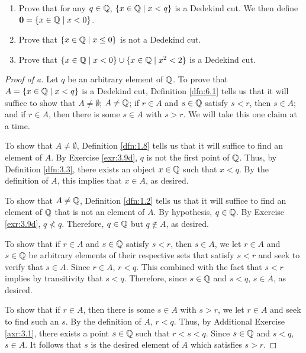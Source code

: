 \documentclass[../main.tex]{subfiles}
\begin{document}
\begin{exercise}\label{exr:6.3}\leavevmode
    \begin{enumerate}[label={(\alph*)},ref={\thetheorem\alph*}]
        \item \label{exr:6.3a}Prove that for any $q\in\mathbb{Q}$, $\{x\in\mathbb{Q}\mid x<q\}$ is a Dedekind cut. We then define $\bm{0}=\{x\in\mathbb{Q}\mid x<0\}$.
        \item \label{exr:6.3b}Prove that $\{x\in\mathbb{Q}\mid x\leq 0\}$ is not a Dedekind cut.
        \item \label{exr:6.3c}Prove that $\{x\in\mathbb{Q}\mid x<0\}\cup\{x\in\mathbb{Q}\mid x^2<2\}$ is a Dedekind cut.
    \end{enumerate}
    \begin{proof}[Proof of a]
        Let $q$ be an arbitrary element of $\mathbb{Q}$. To prove that $A=\{x\in\mathbb{Q}\mid x<q\}$ is a Dedekind cut, Definition \ref{dfn:6.1} tells us that it will suffice to show that $A\neq\emptyset$; $A\neq\mathbb{Q}$; if $r\in A$ and $s\in\mathbb{Q}$ satisfy $s<r$, then $s\in A$; and if $r\in A$, then there is some $s\in A$ with $s>r$. We will take this one claim at a time.\par
        To show that $A\neq\emptyset$, Definition \ref{dfn:1.8} tells us that it will suffice to find an element of $A$. By Exercise \ref{exr:3.9d}, $q$ is not the first point of $\mathbb{Q}$. Thus, by Definition \ref{dfn:3.3}, there exists an object $x\in\mathbb{Q}$ such that $x<q$. By the definition of $A$, this implies that $x\in A$, as desired.\par
        To show that $A\neq\mathbb{Q}$, Definition \ref{dfn:1.2} tells us that it will suffice to find an element of $\mathbb{Q}$ that is not an element of $A$. By hypothesis, $q\in\mathbb{Q}$. By Exercise \ref{exr:3.9d}, $q\not<q$. Therefore, $q\in\mathbb{Q}$ but $q\notin A$, as desired.\par
        To show that if $r\in A$ and $s\in\mathbb{Q}$ satisfy $s<r$, then $s\in A$, we let $r\in A$ and $s\in\mathbb{Q}$ be arbitrary elements of their respective sets that satisfy $s<r$ and seek to verify that $s\in A$. Since $r\in A$, $r<q$. This combined with the fact that $s<r$ implies by transitivity that $s<q$. Therefore, since $s\in\mathbb{Q}$ and $s<q$, $s\in A$, as desired.\par
        To show that if $r\in A$, then there is some $s\in A$ with $s>r$, we let $r\in A$ and seek to find such an $s$. By the definition of $A$, $r<q$. Thus, by Additional Exercise \ref{axr:3.1}, there exists a point $s\in\mathbb{Q}$ such that $r<s<q$. Since $s\in\mathbb{Q}$ and $s<q$, $s\in A$. It follows that $s$ is the desired element of $A$ which satisfies $s>r$.

\end{proof}
\end{exercise}
\end{document}
